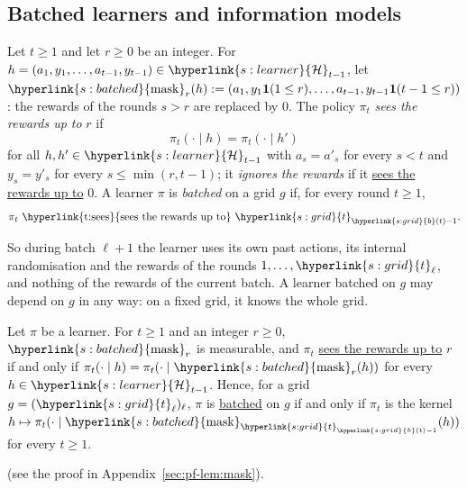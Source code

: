 \documentclass[11pt]{article}
\newcommand{\dt}[1]{\hypertarget{#1}{}}
\newcommand{\sy}[2]{{\hyperlink{#1}{#2}}}
\newcommand{\term}[2]{\hyperlink{#1}{#2}}
\newcommand{\1}{\mathbf{1}}
\newcommand{\Hs}{\sy{s:learner}{\mathcal H}}
\newcommand{\tl}{\sy{s:grid}{t}}
\newcommand{\bt}{\sy{s:grid}{b}}
\newcommand{\mask}{\sy{s:batched}{\mathrm{mask}}}
\newcommand{\sees}{\term{t:sees}{sees the rewards up to}}
\newcommand{\batched}{\term{t:batched}{batched}}
\begin{document}
\subsection{Batched learners and information models}

\begin{definition}\label{def:batched}
\dt{s:batched}Let $t\ge1$ and let $r\ge0$ be an integer. For
$h=(a_1,y_1,\dots,a_{t-1},y_{t-1})\in\Hs_{t-1}$, let
$\mask_r(h):=(a_1,y_1\1(1\le r),\dots,a_{t-1},y_{t-1}\1(t-1\le r))$: the rewards of the rounds
$s>r$ are replaced by $0$. The policy $\pi_t$ \dt{t:sees}\emph{sees the rewards up to} $r$ if
\begin{equation*}
  \pi_t(\cdot\mid h)=\pi_t(\cdot\mid h')
\end{equation*}
for all $h,h'\in\Hs_{t-1}$ with $a_s=a'_s$ for every $s<t$ and $y_s=y'_s$ for every $s\le\min(r,t-1)$;
it \emph{ignores the rewards} if it \sees{} $0$. A learner $\pi$ is \dt{t:batched}\emph{batched} on
a grid $g$ if, for every round $t\ge1$,
\begin{equation*}
  \pi_t\ \text{\sees}\ \tl_{\bt(t)-1}.
\end{equation*}
\end{definition}

So during batch $\ell+1$ the learner uses its own past actions, its internal randomisation and the
rewards of the rounds $1,\dots,\tl_\ell$, and nothing of the rewards of the current batch. A learner
batched on $g$ may depend on $g$ in any way: on a fixed grid, it knows the whole grid.

\begin{lemma}\label{lem:mask}
Let $\pi$ be a learner. For $t\ge1$ and an integer $r\ge0$, $\mask_r$ is measurable, and $\pi_t$
\sees{} $r$ if and only if $\pi_t(\cdot\mid h)=\pi_t(\cdot\mid\mask_r(h))$ for every
$h\in\Hs_{t-1}$. Hence, for a grid $g=(\tl_\ell)_\ell$, $\pi$ is
\batched{} on $g$ if and only if $\pi_t$ is the kernel $h\mapsto\pi_t(\cdot\mid\mask_{\tl_{\bt(t)-1}}(h))$
for every $t\ge1$.
\end{lemma}
(see the proof in Appendix~\ref{sec:pf-lem:mask}).
\end{document}
